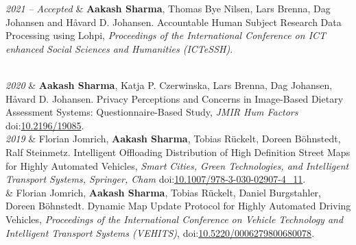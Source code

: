 \documentclass[11pt, a4paper]{article}
\newcommand{\LastName}{Sharma}
\newcommand{\Initials}{A}
\newcommand{\Me}{\textbf{\LastName, \Initials}}  %
\newcommand{\DOI}[1]{doi:\href{https://doi.org/#1}{#1}}
\newcommand{\Year}[1]{\fontsize{10pt}{0}\selectfont #1}
\begin{document}
\begin{EntriesTable}
	\Year{\textit{2021} \textit{-- Accepted}}  &
\textbf{Aakash Sharma}, Thomas Bye Nilsen, Lars Brenna, Dag Johansen and H{\aa}vard D. Johansen.
Accountable Human Subject Research Data Processing using Lohpi,
\emph{Proceedings of the International Conference on ICT enhanced Social Sciences and Humanities (ICTeSSH)}. 

\\
	\Year{\textit{2020}}  &
	\textbf{Aakash Sharma}, Katja P. Czerwinska, Lars Brenna, Dag Johansen, H{\aa}vard D. Johansen.
Privacy Perceptions and Concerns in Image-Based Dietary Assessment Systems: Questionnaire-Based Study,
	\emph{JMIR Hum Factors}
	\DOI{10.2196/19085}.
	\\
	
\Year{\textit{2019}}  &
    Florian Jomrich, \textbf{Aakash Sharma}, Tobias R{\"u}ckelt, Doreen B{\"o}hnstedt, Ralf Steinmetz.
    Intelligent Offloading Distribution of High Definition Street Maps for Highly Automated Vehicles,
    \emph{Smart Cities, Green Technologies, and Intelligent Transport Systems, Springer, Cham}
   \DOI{10.1007/978-3-030-02907-4\_11}.
   \\
\Year{2017}  &
    Florian Jomrich, \textbf{Aakash Sharma}, Tobias R{\"u}ckelt, Daniel Burgstahler, Doreen B{\"o}hnstedt.
    Dynamic Map Update Protocol for Highly Automated Driving Vehicles,
    \emph{Proceedings of the International Conference on Vehicle Technology and Intelligent Transport Systems (VEHITS)},
    \DOI{10.5220/0006279800680078}.
    \\
\end{EntriesTable}




\iffalse

\subsection*{Open Datasets}

\begin{EntriesTable}
\Year{2017}  &
    \Me, \Val.
    A gravity-derived Moho model for South America: source code, data, and
    model results from ``Fast non-linear gravity inversion in spherical
    coordinates with application to the South American Moho''.
    \DOI{10.6084/m9.figshare.3987267}
\end{EntriesTable}
\fi
\end{document}
